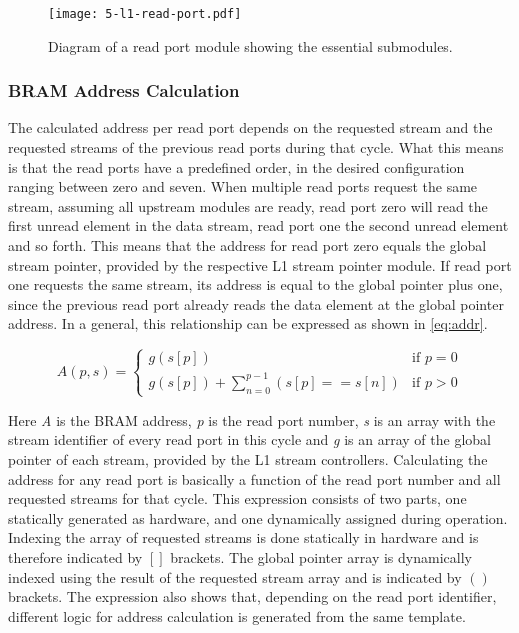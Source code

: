 \begin{figure}[H]
  \centering
  \texttt{[image: 5-l1-read-port.pdf]}
  \caption{Diagram of a read port module showing the essential submodules.}
  \label{fig:5-l1-read-port}
\end{figure}



\subsubsection{BRAM Address Calculation}
The calculated address per read port depends on the requested stream and the requested streams of the previous read ports during that cycle. What this means is that the read ports have a predefined order, in the desired configuration ranging between zero and seven. When multiple read ports request the same stream, assuming all upstream modules are ready, read port zero will read the first unread element in the data stream, read port one the second unread element and so forth. This means that the address for read port zero equals the global stream pointer, provided by the respective L1 stream pointer module. If read port one requests the same stream, its address is equal to the global pointer plus one, since the previous read port already reads the data element at the global pointer address. In a general, this relationship can be expressed as shown in \autoref{eq:addr}.

\begin{equation}
  A(p, s) = \begin{cases}
  g(s[p])                                   & \text{if } p = 0 \\
  g(s[p]) + \sum_{n=0}^{p-1} (s[p] == s[n]) & \text{if } p > 0
  \end{cases}
  \label{eq:addr}
\end{equation}

Here \textit{A} is the BRAM address, \textit{p} is the read port number, \textit{s} is an array with the stream identifier of every read port in this cycle and \textit{g} is an array of the global pointer of each stream, provided by the L1 stream controllers. Calculating the address for any read port is basically a function of the read port number and all requested streams for that cycle. This expression consists of two parts, one statically generated as hardware, and one dynamically assigned during operation. Indexing the array of requested streams is done statically in hardware and is therefore indicated by $[]$ brackets. The global pointer array is dynamically indexed using the result of the requested stream array and is indicated by $()$ brackets. The expression also shows that, depending on the read port identifier, different logic for address calculation is generated from the same template.

